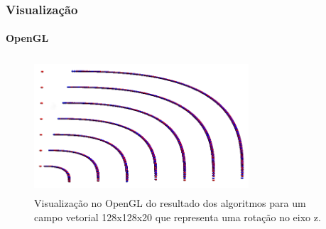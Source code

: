 \documentclass[brazil]{beamer}
\begin{document}
\begin{frame}
  \frametitle{Visualização}
  \framesubtitle{OpenGL}
  
    \begin{figure}
    \begin{center}
      \includegraphics[width=80mm, height=50mm]{rk2-vs-rk4-opengl.png}
      \caption{Visualização no OpenGL do resultado dos algoritmos para um campo vetorial 128x128x20 que representa uma rotação no eixo z.}
    \end{center}
  \end{figure}
\end{frame}
\end{document}
